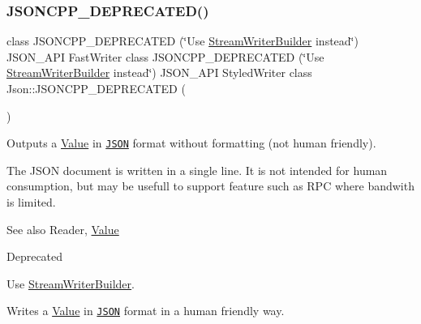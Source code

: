 \subsubsection{\texorpdfstring{J\+S\+O\+N\+C\+P\+P\+\_\+\+D\+E\+P\+R\+E\+C\+A\+T\+E\+D()}{JSONCPP\_DEPRECATED()}\hspace{0.1cm}{\footnotesize\ttfamily [2/3]}}
{\footnotesize\ttfamily class J\+S\+O\+N\+C\+P\+P\+\_\+\+D\+E\+P\+R\+E\+C\+A\+T\+ED (\char`\"{}Use \hyperlink{classJson_1_1StreamWriterBuilder}{Stream\+Writer\+Builder} instead\char`\"{}) J\+S\+O\+N\+\_\+\+A\+PI Fast\+Writer class J\+S\+O\+N\+C\+P\+P\+\_\+\+D\+E\+P\+R\+E\+C\+A\+T\+ED (\char`\"{}Use \hyperlink{classJson_1_1StreamWriterBuilder}{Stream\+Writer\+Builder} instead\char`\"{}) J\+S\+O\+N\+\_\+\+A\+PI Styled\+Writer class Json\+::\+J\+S\+O\+N\+C\+P\+P\+\_\+\+D\+E\+P\+R\+E\+C\+A\+T\+ED (\begin{DoxyParamCaption}\item[{\char`\"{}Use \hyperlink{classJson_1_1StreamWriterBuilder}{Stream\+Writer\+Builder} instead\char`\"{}}]{ }\end{DoxyParamCaption})}



Outputs a \hyperlink{classJson_1_1Value}{Value} in \href{http://www.json.org}{\tt J\+S\+ON} format without formatting (not human friendly). 

The J\+S\+ON document is written in a single line. It is not intended for \textquotesingle{}human\textquotesingle{} consumption, but may be usefull to support feature such as R\+PC where bandwith is limited. \begin{DoxySeeAlso}{See also}
Reader, \hyperlink{classJson_1_1Value}{Value} 
\end{DoxySeeAlso}
\begin{DoxyRefDesc}{Deprecated}
\item[\hyperlink{deprecated__deprecated000008}{Deprecated}]Use \hyperlink{classJson_1_1StreamWriterBuilder}{Stream\+Writer\+Builder}. \end{DoxyRefDesc}
Writes a \hyperlink{classJson_1_1Value}{Value} in \href{http://www.json.org}{\tt J\+S\+ON} format in a human friendly way.

